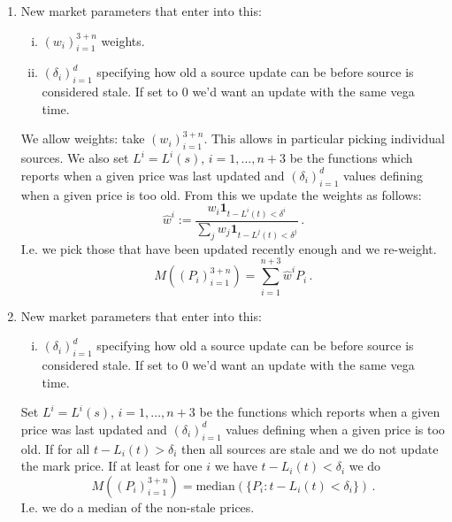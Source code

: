 \documentclass[10pt]{article}
\begin{document}
\begin{enumerate}
\item 
New market parameters that enter into this:
\begin{enumerate}[i)]
\item $(w_i)_{i=1}^{3+n}$ weights.
\item $(\delta_i)_{i=1}^d$ specifying how old a source update can be before source is considered stale. If set to $0$ we'd want an update with the same vega time.
\end{enumerate}

We allow weights: take $(w_i)_{i=1}^{3+n}$. This allows in particular picking individual sources. 
We also set $L^{i}=L^{i}(s)$, $i=1,\ldots,n+3$ be the functions which reports when a given price was last updated and $(\delta_i)_{i=1}^d$ values defining when a given price is too old. 
From this we update the weights as follows:
\[
\hat w^i := \frac{w_i \mathbf{1}_{t-L^i(t)<\delta^i}}{\sum_j w_j\mathbf{1}_{t-L^j(t)<\delta^j}}\,.
\]
I.e. we pick those that have been updated recently enough and we re-weight. 
\[
M((P_i)_{i=1}^{3+n}) = \sum_{i=1}^{n+3} \hat w^i P_i \,.
\]
\item 
New market parameters that enter into this:
\begin{enumerate}[i)]
\item $(\delta_i)_{i=1}^d$ specifying how old a source update can be before source is considered stale. If set to $0$ we'd want an update with the same vega time.
\end{enumerate}


Set $L^{i}=L^{i}(s)$, $i=1,\ldots,n+3$ be the functions which reports when a given price was last updated and $(\delta_i)_{i=1}^d$ values defining when a given price is too old. 
If for all $t-L_i(t) > \delta_i$ then all sources are stale and we do not update the mark price. 
If at least for one $i$ we have $t-L_i(t) < \delta_i$ we do 
\[
M((P_i)_{i=1}^{3+n}) = \text{median}(\{P_i : t-L_i(t) < \delta_i\}) \,.
\]
I.e. we do a median of the non-stale prices. 
%
%
%
\end{enumerate}
\end{document}

